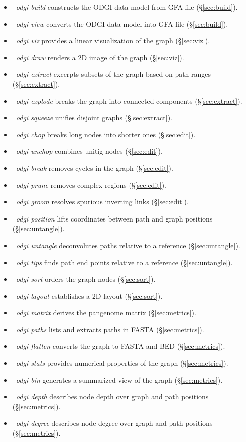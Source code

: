 \documentclass{bioinfo}
\begin{document}
\begin{itemize}
\item~\textit{odgi build} constructs the ODGI data model from GFA file (\S\ref{sec:build}).
\item~\textit{odgi view} converts the ODGI data model into GFA file (\S\ref{sec:build}).
\item~\textit{odgi viz} provides a linear visualization of the graph (\S\ref{sec:viz}).
\item~\textit{odgi draw} renders a 2D image of the graph (\S\ref{sec:viz}).
\item~\textit{odgi extract} excerpts subsets of the graph based on path ranges (\S\ref{sec:extract}).
\item~\textit{odgi explode} breaks the graph into connected components (\S\ref{sec:extract}).
\item~\textit{odgi squeeze} unifies disjoint graphs (\S\ref{sec:extract}).
\item~\textit{odgi chop} breaks long nodes into shorter ones (\S\ref{sec:edit}).
\item~\textit{odgi unchop} combines unitig nodes (\S\ref{sec:edit}).
\item~\textit{odgi break} removes cycles in the graph (\S\ref{sec:edit}).
\item~\textit{odgi prune} removes complex regions (\S\ref{sec:edit}).
\item~\textit{odgi groom} resolves spurious inverting links (\S\ref{sec:edit}).
\item~\textit{odgi position} lifts coordinates between path and graph positions (\S\ref{sec:untangle}).%
\item~\textit{odgi untangle} deconvolutes paths relative to a reference (\S\ref{sec:untangle}).
\item~\textit{odgi tips} finds path end points relative to a reference (\S\ref{sec:untangle}).
\item~\textit{odgi sort} orders the graph nodes (\S\ref{sec:sort}).
\item~\textit{odgi layout} establishes a 2D layout (\S\ref{sec:sort}).
\item~\textit{odgi matrix} derives the pangenome matrix (\S\ref{sec:metrics}).
\item~\textit{odgi paths} lists and extracts paths in FASTA (\S\ref{sec:metrics}).
\item~\textit{odgi flatten} converts the graph to FASTA and BED (\S\ref{sec:metrics}).
\item~\textit{odgi stats} provides numerical properties of the graph (\S\ref{sec:metrics}).
\item~\textit{odgi bin} generates a summarized view of the graph (\S\ref{sec:metrics}).
\item~\textit{odgi depth} describes node depth over graph and path positions (\S\ref{sec:metrics}).
\item~\textit{odgi degree} describes node degree over graph and path positions (\S\ref{sec:metrics}).
\end{itemize}
\end{document}
